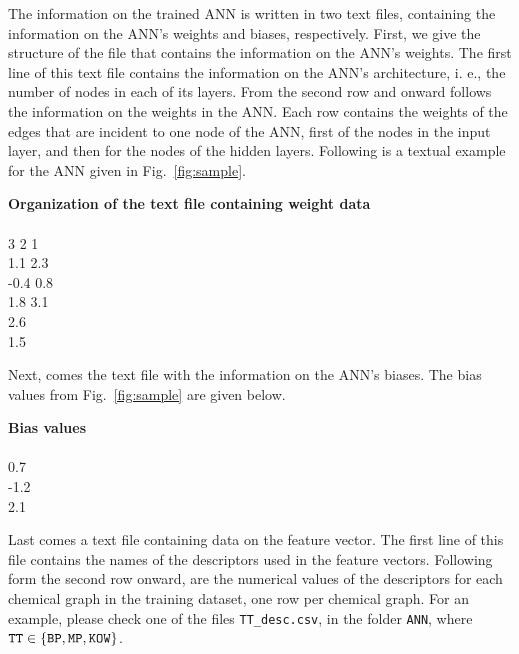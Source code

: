 \documentclass[11pt,titlepage,dvipdfmx,twoside]{book}
\begin{document}
The information on the trained ANN is written in two text files, containing the information
on the ANN's weights and biases, respectively.
First, we give the structure of the file that contains the information on the ANN's weights.
The first line of this text file contains the information on the ANN's architecture, i. e., 
the number of nodes in each of its layers.
From the second row and onward
follows the information on the 
weights in the ANN.
Each row contains the weights of the edges that are incident to one node of the ANN,
first of the nodes in the input layer, and then for the nodes of the hidden layers.
Following is a textual example for the ANN given in Fig.~\ref{fig:sample}.

\bigskip

\begin{oframed}
{\bf Organization of the text file containing weight data}\\\\
3 2 1\\
1.1 2.3\\
-0.4 0.8\\
1.8 3.1\\
2.6\\
1.5\\
\end{oframed}

\bigskip


Next, comes the text file with the information on the ANN's biases.
The bias values from Fig.~\ref{fig:sample} are given below.

\bigskip

\begin{oframed}
{\bf Bias values}\\\\
0.7\\
-1.2\\
2.1\\
\end{oframed}

\bigskip

Last comes a text file containing data on the feature vector.
The first line of this file contains the names of the descriptors used in the feature vectors.
Following form the second row onward, are the numerical values of the descriptors for each chemical graph
in the training dataset, one row per chemical graph.
For an example, please check one of the files  {\tt TT\_desc.csv},  in the folder {\tt ANN},
where ${\tt TT} \in \{{\tt BP, MP, KOW}\}$.
\end{document}
